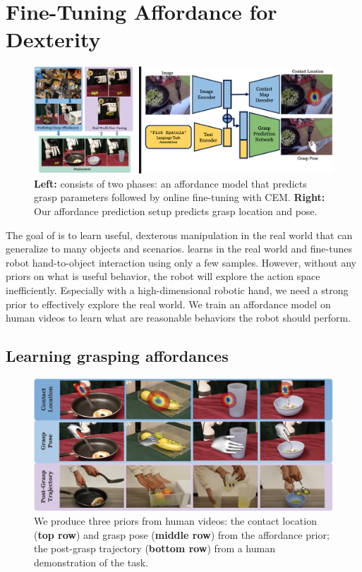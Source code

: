 \section{Fine-Tuning Affordance for Dexterity}
\label{sec:method}

\begin{figure}[H]
\centering
\includegraphics[width=\linewidth]{figs/method_overview.pdf}
\vspace{-0.2in}
  \caption{\small \textbf{Left:}  \ours consists of two phases: an affordance model that predicts grasp parameters followed by online fine-tuning with CEM. \textbf{Right:} Our affordance prediction setup predicts grasp location and pose.}
 \label{fig:aff_method}
 \vspace{-0.15in}
\end{figure}

The goal of \ours is to learn useful, dexterous manipulation in the real world that can generalize to many objects and scenarios.  \ours learns in the real world and fine-tunes robot hand-to-object interaction using only a few samples. However, without any priors on what is useful behavior, the robot will explore the action space inefficiently. Especially with a high-dimensional robotic hand, we need a strong prior to effectively explore the real world. We train an affordance model on human videos to learn what are reasonable behaviors the robot should perform.  

\subsection{Learning grasping affordances}
\begin{figure}[t]
\centering
\includegraphics[width=\linewidth]{figs/aff_results.pdf}
\vspace{-0.2in}
  \caption{\small We produce three priors from human videos: the contact location (\textbf{top row}) and grasp pose (\textbf{middle row}) from the affordance prior; the post-grasp trajectory (\textbf{bottom row}) from a human demonstration of the task.}
 \label{fig:aff_results}
 \vspace{-0.15in}
\end{figure}


